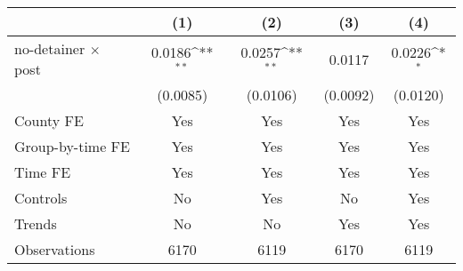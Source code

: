 {
\def\sym#1{\ifmmode^{#1}\else\(^{#1}\)\fi}
\begin{tabular}{l*{4}{c}}
\hline\hline
                    &\multicolumn{1}{c}{(1)}         &\multicolumn{1}{c}{(2)}         &\multicolumn{1}{c}{(3)}         &\multicolumn{1}{c}{(4)}         \\
\hline
no-detainer $\times$ post&      0.0186\sym{**} &      0.0257\sym{**} &      0.0117         &      0.0226\sym{*}  \\
                    &    (0.0085)         &    (0.0106)         &    (0.0092)         &    (0.0120)         \\
[1em]
County FE           &         Yes         &         Yes         &         Yes         &         Yes         \\
[1em]
Group-by-time FE    &         Yes         &         Yes         &         Yes         &         Yes         \\
[1em]
Time FE             &         Yes         &         Yes         &         Yes         &         Yes         \\
[1em]
Controls            &          No         &         Yes         &          No         &         Yes         \\
[1em]
Trends              &          No         &          No         &         Yes         &         Yes         \\
\hline
Observations        &        6170         &        6119         &        6170         &        6119         \\
\hline\hline
\end{tabular}
}
